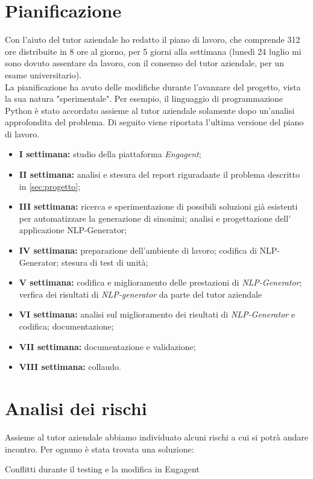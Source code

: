 \section{Pianificazione}
Con l'aiuto del tutor aziendale ho redatto il piano di lavoro, che comprende 312 ore distribuite in 8 ore al giorno, per 5 giorni alla settimana (lunedì 24 luglio mi sono dovuto assentare da lavoro, con il consenso del tutor aziendale, per un esame universitario).\\
La pianificazione ha avuto delle modifiche durante l'avanzare del progetto, vista la sua natura "sperimentale". Per esempio, il linguaggio di programmazione Python è stato accordato assieme al tutor aziendale solamente dopo un'analisi approfondita del problema.
Di seguito viene riportata l'ultima versione del piano di lavoro.
\begin{itemize}
    \item \textbf{I settimana:} studio della piattaforma \emph{Engagent};
    \item \textbf{II settimana:} analisi e stesura del report riguradante il problema descritto in \ref{sec:progetto};
    \item \textbf{III settimana:} ricerca e sperimentazione di possibili soluzioni già esistenti per automatizzare la generazione di sinonimi; analisi e progettazione dell' applicazione NLP-Generator;
    \item \textbf{IV settimana:} preparazione dell'ambiente di lavoro; codifica di NLP-Generator; stesura di test di unità;
    \item \textbf{V settimana:} codifica e miglioramento delle prestazioni di \emph{NLP-Generator}; verfica dei risultati di \emph{NLP-generator} da parte del tutor aziendale
    \item \textbf{VI settimana:} analisi sul miglioramento dei risultati di \emph{NLP-Generator} e codifica; documentazione;
    \item \textbf{VII settimana:} documentazione e validazione;
    \item \textbf{VIII settimana:} collaudo.
\end{itemize}

\section{Analisi dei rischi}

Assieme al tutor aziendale abbiamo individuato alcuni rischi a cui si potrà andare incontro. Per ognuno è stata trovata una soluzione:

\begin{risk}{Conflitti durante il testing e la modifica in Engagent}
    \label{risk:conflict_engagent} 
\end{risk}
